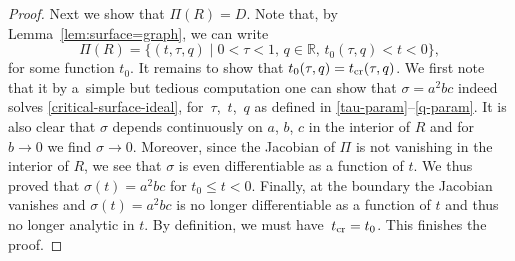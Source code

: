 \documentclass[10pt,a4paper]{amsart}
\numberwithin{equation}{section}
\begin{document}
\begin{proof}
Next we show that $\Pi(R)=D$. Note that, by Lemma~\ref{lem:surface=graph}, we can write
\[
\Pi(R)=\{(t,\tau,q) \mid 0<\tau<1,\, q \in \mathbb R,\, t_0(\tau,q)< t <0\},
\]
for some function $t_0$. It remains to show that $t_0(\tau,q)=t_{\rm cr}(\tau,q)$. We first note that it by a~simple but tedious computation one can show that $\sigma=a^2bc$ indeed solves \eqref{critical-surface-ideal}, for~$\tau$,~$t$,~$q$ as defined in \eqref{tau-param}--\eqref{q-param}. It is also clear that $\sigma$ depends continuously on $a$, $b$, $c$ in the interior of $R$ and for~${b\to 0}$ we find $\sigma\to 0$. Moreover, since the Jacobian of $\Pi$ is not vanishing in the interior of $R$, we see that $\sigma$ is even differentiable as a function of $t$. We thus proved that $\sigma(t)=a^2bc$ for $t_0 \leq t <0$. Finally, at the boundary the Jacobian vanishes and $\sigma(t)=a^2bc$ is no longer differentiable as a function of $t$ and thus no longer analytic in $t$. By definition, we must have~${t_{\rm cr}=t_0}$. This finishes the proof.
\end{proof}
\end{document}
